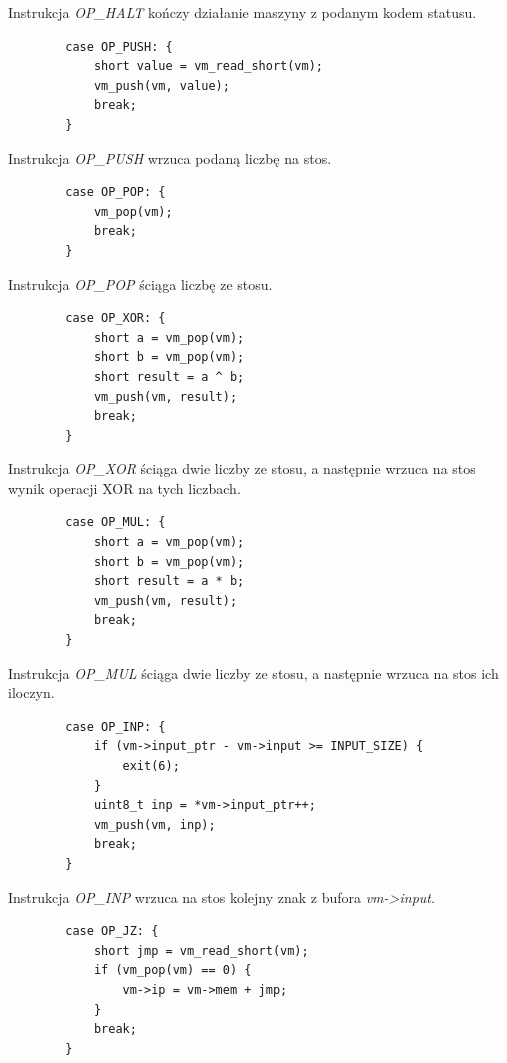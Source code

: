 \documentclass[language=polish,type=eng]{aghmodern}
\begin{document}
Instrukcja \emph{OP\_HALT} kończy działanie maszyny z podanym kodem statusu.

\begin{verbatim}
        case OP_PUSH: {
            short value = vm_read_short(vm);
            vm_push(vm, value);
            break;
        }
\end{verbatim}

Instrukcja \emph{OP\_PUSH} wrzuca podaną liczbę na stos.

\begin{verbatim}
        case OP_POP: {
            vm_pop(vm);
            break;
        }
\end{verbatim}

Instrukcja \emph{OP\_POP} ściąga liczbę ze stosu.

\begin{verbatim}
        case OP_XOR: {
            short a = vm_pop(vm);
            short b = vm_pop(vm);
            short result = a ^ b;
            vm_push(vm, result);
            break;
        }
\end{verbatim}

Instrukcja \emph{OP\_XOR} ściąga dwie liczby ze stosu, a następnie wrzuca na stos wynik
operacji XOR na tych liczbach.

\begin{verbatim}
        case OP_MUL: {
            short a = vm_pop(vm);
            short b = vm_pop(vm);
            short result = a * b;
            vm_push(vm, result);
            break;
        }
\end{verbatim}

Instrukcja \emph{OP\_MUL} ściąga dwie liczby ze stosu, a następnie wrzuca na stos ich iloczyn.

\begin{verbatim}
        case OP_INP: {
            if (vm->input_ptr - vm->input >= INPUT_SIZE) {
                exit(6);
            }
            uint8_t inp = *vm->input_ptr++;
            vm_push(vm, inp);
            break;
        }
\end{verbatim}

Instrukcja \emph{OP\_INP} wrzuca na stos kolejny znak z bufora \emph{vm->input}.

\begin{verbatim}
        case OP_JZ: {
            short jmp = vm_read_short(vm);
            if (vm_pop(vm) == 0) {
                vm->ip = vm->mem + jmp;
            }
            break;
        }
\end{verbatim}
\end{document}
